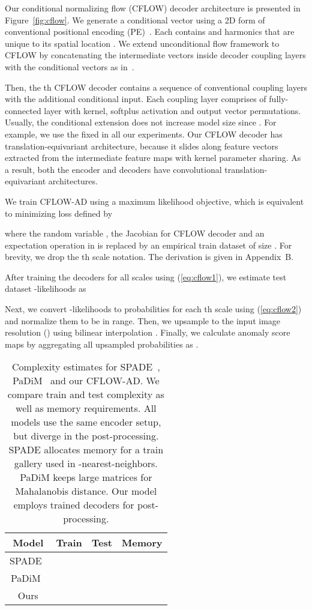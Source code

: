 \documentclass[10pt,twocolumn,letterpaper]{article}
\begin{document}
Our conditional normalizing flow (CFLOW) decoder architecture is presented in Figure~\ref{fig:cflow}. We generate a conditional vector  using a 2D form of conventional positional encoding (PE)~\cite{NIPS2017_3f5ee243}. Each  contains  and  harmonics that are unique to its spatial location . We extend unconditional flow framework to CFLOW by concatenating the intermediate vectors inside decoder coupling layers with the conditional vectors  as in~\cite{ardizzone2019guided}.

Then, the th CFLOW decoder contains a sequence of conventional coupling layers with the additional conditional input. Each coupling layer comprises of fully-connected layer with  kernel, softplus activation and output vector permutations. Usually, the conditional extension does not increase model size since . For example, we use the fixed  in all our experiments. Our CFLOW decoder has translation-equivariant architecture, because it slides along feature vectors extracted from the intermediate feature maps with kernel parameter sharing. As a result, both the encoder  and decoders  have convolutional translation-equivariant architectures.

We train CFLOW-AD using a maximum likelihood objective, which is equivalent to minimizing loss defined by

where the random variable , the Jacobian  for CFLOW decoder and an expectation operation in  is replaced by an empirical train dataset  of size . For brevity, we drop the th scale notation. The derivation is given in Appendix~B.

After training the decoders  for all  scales using (\ref{eq:cflow1}), we estimate test dataset  -likelihoods as 


Next, we convert -likelihoods to probabilities  for each th scale using (\ref{eq:cflow2}) and normalize them to be in  range. Then, we upsample  to the input image resolution () using bilinear interpolation . Finally, we calculate anomaly score maps  by aggregating all upsampled probabilities as .

\begin{table}[t]
	\caption{Complexity estimates for SPADE~\cite{cohen2021subimage}, PaDiM~\cite{defard2020padim} and our CFLOW-AD. We compare train and test complexity as well as memory requirements. All models use the same encoder  setup, but diverge in the post-processing. SPADE allocates memory for a train gallery  used in -nearest-neighbors. PaDiM keeps large matrices  for Mahalanobis distance. Our model employs trained decoders  for post-processing.}
	\label{tab:comp_est}
	\centering
	\begin{tabular}{cccc}
		\toprule
		Model   & Train & Test & Memory \\
		\midrule
		SPADE~\cite{cohen2021subimage}&  &  &  \\
		PaDiM~\cite{defard2020padim}  &  &  &  \\
		Ours&   &  &  \\
		\bottomrule
	\end{tabular}
\end{table}
\end{document}
